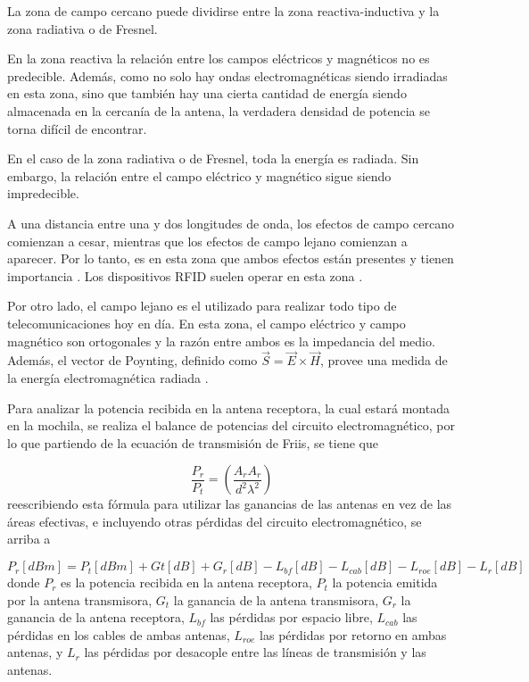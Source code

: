 La zona de campo cercano puede dividirse entre la zona reactiva-inductiva y la zona radiativa o de Fresnel. 

En la zona reactiva la relación entre los campos eléctricos y magnéticos no es predecible. Además, como no solo hay ondas electromagnéticas siendo irradiadas en esta zona, sino que también hay una cierta cantidad de energía siendo almacenada en la cercanía de la antena, la verdadera densidad de potencia se torna difícil de encontrar.

En el caso de la zona radiativa o de Fresnel, toda la energía es radiada. Sin embargo, la relación entre el campo eléctrico y magnético sigue siendo impredecible.

A una distancia entre una y dos longitudes de onda, los efectos de campo cercano comienzan a cesar, mientras que los efectos de campo lejano comienzan a aparecer. Por lo tanto, es en esta zona que ambos efectos están presentes y tienen importancia \cite{ref:NearFieldVsFarField}. Los dispositivos RFID suelen operar en esta zona \cite{ref:NearFieldUHFRFID}.

Por otro lado, el campo lejano es el utilizado para realizar todo tipo de telecomunicaciones hoy en día. En esta zona, el campo eléctrico y campo magnético son ortogonales y la razón entre ambos es la impedancia del medio. Además, el vector de Poynting, definido como $\vec{S} = \vec{E}\times \vec{H}$, provee una medida de la energía electromagnética radiada \cite{ref:PhysicsOscillations}.

Para analizar la potencia recibida en la antena receptora, la cual estará montada en la mochila, se realiza el balance de potencias del circuito electromagnético, por lo que partiendo de la ecuación de transmisión de Friis, se tiene que

\begin{equation}
\frac{P_r}{P_t} = \left( \frac{A_rA_r}{d^2\lambda ^2} \right)
\end{equation}
reescribiendo esta fórmula para utilizar las ganancias de las antenas en vez de las áreas efectivas, e incluyendo otras pérdidas del circuito electromagnético, se arriba a

\begin{equation}
P_r[dBm] = P_t[dBm] + Gt[dB] + G_r[dB] - L_{bf}[dB] - L_{cab}[dB] - L_{roe}[dB] - L_{r}[dB]
\end{equation}
\label{eq:balance_potencias}
donde $P_r$ es la potencia recibida en la antena receptora, $P_t$ la potencia emitida por la antena transmisora, $G_t$ la ganancia de la antena transmisora, $G_r$ la ganancia de la antena receptora, $L_{bf}$ las pérdidas por espacio libre, $L_{cab}$ las pérdidas en los cables de ambas antenas, $L_{roe}$ las pérdidas por retorno en ambas antenas, y $L_{r}$ las pérdidas por desacople entre las líneas de transmisión y las antenas.

